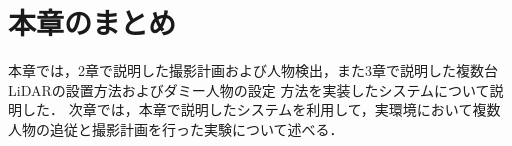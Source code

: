 \documentclass[autodetect-engine,dvipdfmx-if-dvi,ja=standard,a4j,jbase=11pt,magstyle=nomag*]{bxjsreport}
\begin{document}
\newpage
\section{本章のまとめ}
本章では，2章で説明した撮影計画および人物検出，また3章で説明した複数台LiDARの設置方法およびダミー人物の設定
方法を実装したシステムについて説明した．
次章では，本章で説明したシステムを利用して，実環境において複数人物の追従と撮影計画を行った実験について述べる．
\end{document}
